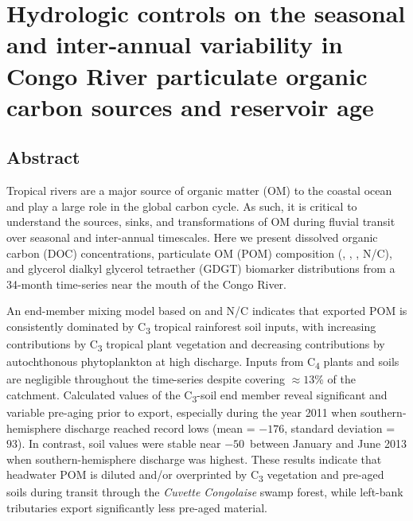 \chapter{Hydrologic controls on the seasonal and inter-annual variability in Congo River particulate organic carbon sources and reservoir age}
\label{Ch5}
\raggedbottom

{\let\thefootnote\relax{}}

\clearpage

\section{Abstract}

Tropical rivers are a major source of organic matter (OM) to the coastal ocean and play a large role in the global carbon cycle. As such, it is critical to understand the sources, sinks, and transformations of OM during fluvial transit over seasonal and inter-annual timescales. Here we present dissolved organic carbon (DOC) concentrations, particulate OM (POM) composition (, , , N/C), and glycerol dialkyl glycerol tetraether (GDGT) biomarker distributions from a 34-month time-series near the mouth of the Congo River.

An end-member mixing model based on  and N/C indicates that exported POM is consistently dominated by C\textsubscript{3} tropical rainforest soil inputs, with increasing contributions by C\textsubscript{3} tropical plant vegetation and decreasing contributions by autochthonous phytoplankton at high discharge. Inputs from C\textsubscript{4} plants and soils are negligible throughout the time-series despite covering $\approx 13$\% of the catchment. Calculated  values of the C\textsubscript{3}-soil end member reveal significant and variable pre-aging prior to export, especially during the year 2011 when southern-hemisphere discharge reached record lows (mean = $-176$\textperthousand, standard deviation = $93$\textperthousand). In contrast, soil  values were stable near $-50$\textperthousand\ between January and June 2013 when southern-hemisphere discharge was highest. These results indicate that headwater POM is diluted and/or overprinted by C\textsubscript{3} vegetation and pre-aged soils during transit through the \textit{Cuvette Congolaise} swamp forest, while left-bank tributaries export significantly less pre-aged material.

